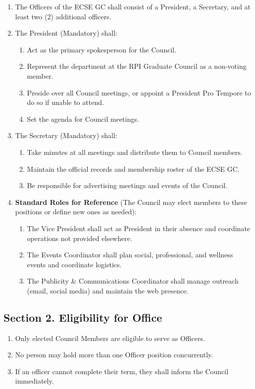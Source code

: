 \documentclass[11pt]{article}
\newcommand{\orgshort}{ECSE GC}
\newcommand{\Sec}[1]{\subsection*{Section {#1}}}
\begin{document}
\begin{enumerate}
    \item The Officers of the \orgshort{} shall consist of a President, a Secretary, and at least two (2) additional officers.
    
    \item The President (Mandatory) shall:
    \begin{enumerate}
        \item Act as the primary spokesperson for the Council.
        \item Represent the department at the RPI Graduate Council as a non-voting member.
        \item Preside over all Council meetings, or appoint a President Pro Tempore to do so if unable to attend.
        \item Set the agenda for Council meetings.
    \end{enumerate}

    \item The Secretary (Mandatory) shall:
    \begin{enumerate}
        \item Take minutes at all meetings and distribute them to Council members.
        \item Maintain the official records and membership roster of the \orgshort{}.
        \item Be responsible for advertising meetings and events of the Council.
    \end{enumerate}

    \item \textbf{Standard Roles for Reference} (The Council may elect members to these positions or define new ones as needed):
    \begin{enumerate}
        \item The Vice President shall act as President in their absence and coordinate operations not provided elsewhere.
        \item The Events Coordinator shall plan social, professional, and wellness events and coordinate logistics.
        \item The Publicity \& Communications Coordinator shall manage outreach (email, social media) and maintain the web presence.
    \end{enumerate}
\end{enumerate}

\Sec{2. Eligibility for Office}
\begin{enumerate}[label=\alph*)]
    \item Only elected Council Members are eligible to serve as Officers.
    \item No person may hold more than one Officer position concurrently.
    \item If an officer cannot complete their term, they shall inform the Council immediately.
\end{enumerate}
\end{document}

